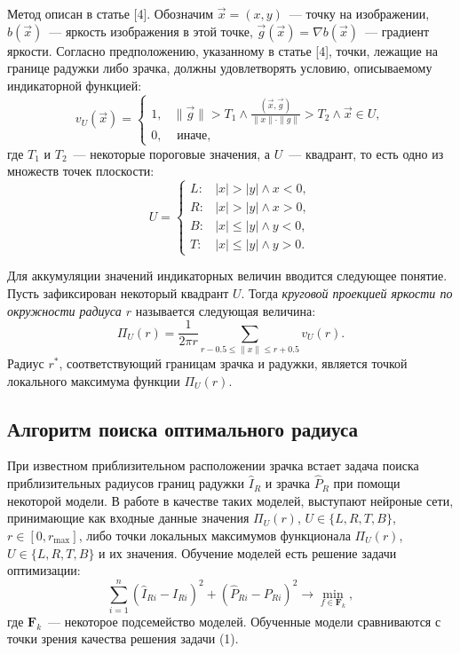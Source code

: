 \documentclass[12pt, twoside]{article}
\begin{document}
Метод описан в статье [4]. Обозначим $\vec{x} = (x, y)$~--- точку на изображении, $b(\vec{x})$~--- яркость изображения в этой точке, $\vec{g}(\vec{x}) = \nabla b(\vec{x})$~--- градиент яркости. Согласно предположению, указанному в статье [4], точки, лежащие на границе радужки либо зрачка, должны удовлетворять условию, описываемому индикаторной функцией:
\[
v_U(\vec{x}) = \begin{cases}1, & \parallel \vec{g} \parallel > T_1 \land \frac{(\vec{x}, \vec{g})}{\parallel x \parallel \cdot \parallel g \parallel} > T_2 \land \vec{x} \in U, \\ 0, & \text{ иначе,}\end{cases}
\]
где $T_1$ и $T_2$~--- некоторые пороговые значения, а $U$~--- квадрант, то есть одно из множеств точек плоскости:
\[
U = \begin{cases}L\!: & |x| > |y| \land x < 0, \\ R\!: & |x| > |y| \land x > 0, \\ B\!: & |x| \leqslant |y| \land y < 0, \\ T\!: & |x| \leqslant |y| \land y > 0.\end{cases}
\]

Для аккумуляции значений индикаторных величин вводится следующее понятие. Пусть зафиксирован некоторый квадрант $U$. Тогда \textit{круговой проекцией яркости по окружности радиуса $r$} называется следующая величина:
\[
\Pi_U(r) = \frac{1}{2\pi r} \sum_{r-0.5 \leqslant \parallel x \parallel \leqslant r + 0.5} v_U(r).
\]
Радиус $r^*$, соответствующий границам зрачка и радужки, является точкой локального максимума функции $\Pi_U(r)$.

\subsection{Алгоритм поиска оптимального радиуса}

При известном приблизительном расположении зрачка встает задача поиска приблизительных радиусов границ радужки $\widehat{I}_R$ и зрачка $\widehat{P}_R$ при помощи некоторой модели. В работе в качестве таких моделей, выступают нейроные сети, принимающие как входные данные значения $\Pi_U(r)$, $U \in \{L, R, T, B\}$,  $r \in [0, r_{\max }] $, либо точки локальных максимумов функционала $\Pi_U(r)$, $U \in \{L, R, T, B\}$ и их значения. Обучение моделей есть решение задачи оптимизации:
\[
\sum_{i=1}^n \left(\widehat{I}_{Ri} - I_{Ri}\right)^2 + \left(\widehat{P}_{Ri} - P_{Ri}\right)^2 \to \min_{f \in \mathbf{F}_k},
\]
где $\mathbf{F}_k$~--- некоторое подсемейство моделей. Обученные модели сравниваются с точки зрения качества решения задачи (1).
\end{document}
